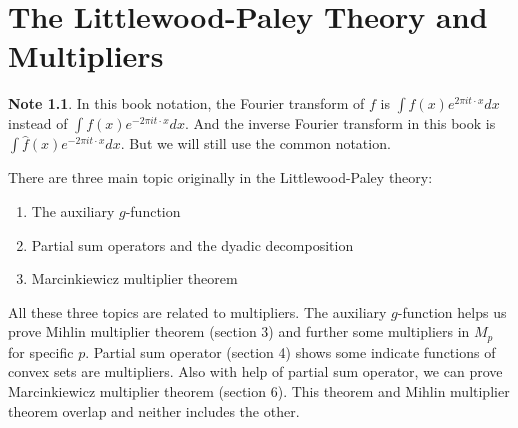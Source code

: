\documentclass{report}
\theoremstyle{definition}
\newtheorem{note}{Note}
\theoremstyle{definition}
\theoremstyle{plain}
\numberwithin{theorem}{section}
\numberwithin{remark}{section}
\numberwithin{equation}{section}
\begin{document}
\tableofcontents
\chapter{The Littlewood-Paley Theory and Multipliers}
\begin{note}
    In this book notation, the Fourier transform of $f$ is $\int f(x)e^{2\pi i t\cdot x} dx$ instead of $\int f(x)e^{-2\pi i t\cdot x} dx$. And the inverse Fourier transform in this book is $\int \hat{f}(x)e^{-2\pi i t\cdot x} dx$. But we will still use the common notation.
\end{note}
There are three main topic originally in the Littlewood-Paley theory:
\begin{enumerate}
    \item The auxiliary $g$-function
    \item Partial sum operators and the dyadic decomposition
    \item Marcinkiewicz multiplier theorem
\end{enumerate}
All these three topics are related to multipliers. The auxiliary $g$-function helps us prove Mihlin multiplier theorem (section 3) and further some multipliers in $M_p$ for specific $p$. Partial sum operator (section 4) shows some indicate functions of convex sets are multipliers. Also with help of partial sum operator, we can prove Marcinkiewicz multiplier theorem (section 6). This theorem and Mihlin multiplier theorem overlap and neither includes the other.
\end{document}
